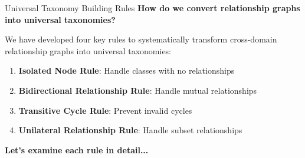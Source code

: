 \documentclass[aspectratio=169]{beamer}
\begin{document}
\begin{frame}{Universal Taxonomy Building Rules}
    \textbf{How do we convert relationship graphs into universal taxonomies?}

    \vspace{1em}

    We have developed four key rules to systematically transform cross-domain relationship graphs into universal taxonomies:

    \begin{enumerate}
        \item \textbf{Isolated Node Rule}: Handle classes with no relationships
        \item \textbf{Bidirectional Relationship Rule}: Handle mutual relationships
        \item \textbf{Transitive Cycle Rule}: Prevent invalid cycles
        \item \textbf{Unilateral Relationship Rule}: Handle subset relationships
    \end{enumerate}

    \vspace{1em}

    \textbf{Let's examine each rule in detail...}
\end{frame}
\end{document}
